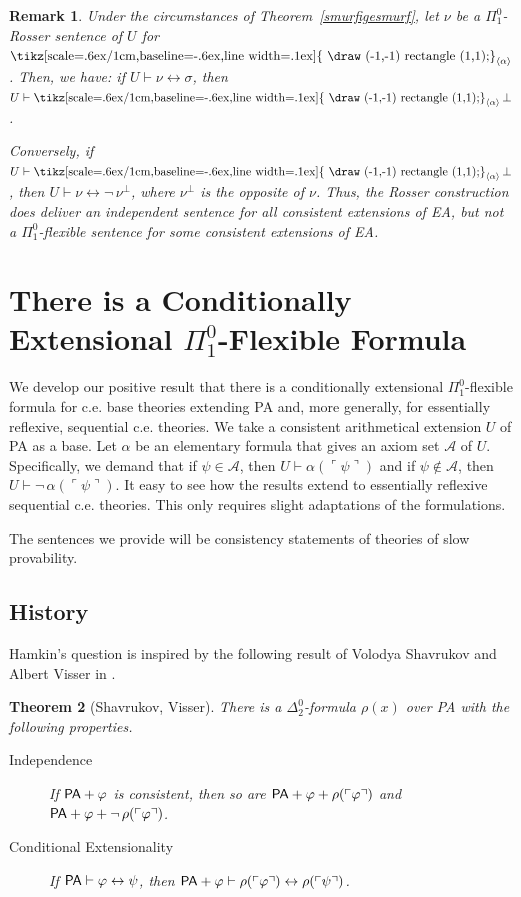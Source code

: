 \documentclass{amsart}
\newcommand{\qee} {\hspace*{2mm}\hfill \ding{109}}
\renewcommand{\iff}{\leftrightarrow}
\renewcommand{\phi}{\varphi}
\newtheorem{theorem}{Theorem}[section]
\newtheorem{rem}[theorem]{Remark}
\newenvironment{remark}{\begin{rem} \rm}{\qee\end{rem}}
\DeclareMathOperator{\necessary}{\text{\tikz[scale=.6ex/1cm,baseline=-.6ex,line width=.1ex]{
                            \draw (-1,-1) rectangle (1,1);}}}
\newcommand{\gnum}[1]{{\ulcorner #1 \urcorner}}
\newcommand{\mc}[1]{\mathcal #1}
\newcommand{\tupel}[1]{{\langle #1 \rangle}}
\newcommand{\apr}{{\vartriangle}}
\newcommand{\opr}{\necessary}
\begin{document}

\begin{remark}{\footnotesize
Under the circumstances of Theorem~\ref{smurfigesmurf}, let $\nu$ be a $\Pi^0_1$-Rosser sentence of $U$ for $\opr_{\tupel{\alpha}}$.
Then, we have: if $U \vdash \nu \iff \sigma$, then $U \vdash \opr_{\tupel{\alpha}}\bot$. 

Conversely, if $U \vdash \opr_{\tupel{\alpha}}\bot$, then
$U \vdash \nu \iff \neg\, \nu^\bot$, where $\nu^\bot$ is the opposite of $\nu$. Thus, the Rosser construction does deliver an independent sentence
for all consistent extensions of {\sf EA}, but not a $\Pi^0_1$-flexible
sentence for some consistent extensions of {\sf EA}.}
\end{remark}


  
\section{There is a Conditionally Extensional  $\Pi^0_1$-Flexible Formula}
We develop our positive result that there is a conditionally extensional $\Pi^0_1$-flexible formula for
  c.e. base theories extending {\sf PA} and, more generally, for essentially reflexive, sequential c.e. theories.
  We take a consistent arithmetical extension $U$ of {\sf PA} as a base. Let $\alpha$ be an elementary formula that
  gives an axiom set $\mc A$ of $U$. Specifically, we demand that if $\psi\in \mc A$, then $U \vdash \alpha(\gnum\psi)$ and
   if $\psi\not\in \mc A$, then $U \vdash\neg\, \alpha(\gnum\psi)$.
 It easy to see how the results extend to essentially reflexive sequential  c.e. theories.
 This only requires slight adaptations of the formulations.
 
  The sentences we provide will be consistency statements of theories of slow provability.
  
  \subsection{History}
  Hamkin's question is inspired by the following result of Volodya Shavrukov and Albert Visser in \cite{shav:unif14}.
\begin{theorem}[Shavrukov, Visser]
There is a $\Delta^0_2$-formula $\rho(x)$ over {\sf PA} with the following properties.
\begin{description}
\item[Independence] If ${\sf PA}+ \phi$ is consistent, then so are ${\sf PA}+ \phi+\rho(\gnum\phi)$ and\\
 ${\sf PA}+ \phi+\neg\, \rho(\gnum\phi)$.
\item[Conditional Extensionality] If ${\sf PA} \vdash \phi \iff \psi$, then $ {\sf PA}+ \phi \vdash\rho(\gnum \phi) \iff \rho(\gnum\psi)$.
\end{description}
\end{theorem}
\end{document}
